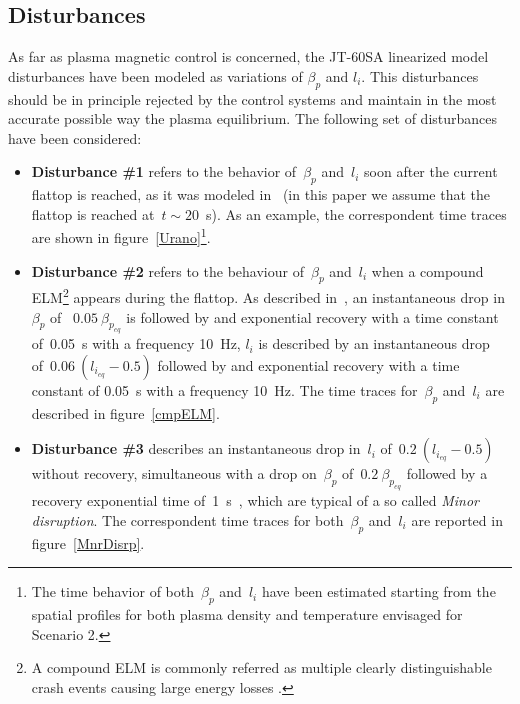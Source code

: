 \subsection{Disturbances}


As far as plasma magnetic control is concerned, the JT-60SA linearized model disturbances have been modeled as variations of $\beta_p$ and $l_i$. This disturbances should be in principle rejected by the control systems and maintain in the most accurate possible way the plasma equilibrium.  The following set of disturbances have been considered: 

\begin{itemize}
	\item \textbf{Disturbance \#1} refers to the behavior of~$\beta_p$ and~$l_i$ soon after the current flattop is reached, as it was modeled in~\cite{urano2015development} (in this paper we assume that the flattop is reached at~$t\sim 20$~s). As an example, the correspondent time traces are shown in figure~\ref{Urano}\footnote{The time behavior of both~$\beta_p$ and~$l_i$ have been estimated starting from the spatial profiles for both plasma density and temperature envisaged for Scenario 2.}.
	
	


	
	\item \textbf{Disturbance \#2} refers to the behaviour of~$\beta_p$ and~$l_i$ when a compound ELM\footnote{A compound ELM is commonly referred as multiple clearly distinguishable
	crash events causing large energy losses \cite{Meyer2017}.} appears during the flattop.  As described in~\cite[p.~34]{JT60SA:PID}, an instantaneous drop   in~$\beta_p$ of ~$0.05~\beta_{p_{eq}}$ is followed by and exponential recovery with a time constant of~0.05~s with a frequency 10~Hz, $l_i$ is described by an instantaneous drop of~$0.06~(l_{i_{eq}}-0.5)$ followed by and exponential recovery with a time constant of 0.05~s with a frequency 10~Hz. The time traces for~$\beta_p$ and~$l_i$ are described in figure~\ref{cmpELM}.
	


	
	\item \textbf{Disturbance \#3} describes an instantaneous drop in~$l_i$ of~$0.2~(l_{i_{eq}}-0.5)$ without recovery, simultaneous with a drop on~$\beta_p$ of~$0.2~\beta_{p_{eq}}$ followed by a recovery exponential time of~1~s~\cite[p.~34]{JT60SA:PID}, which are typical of a so called \emph{Minor disruption}. The correspondent time traces for both~$\beta_p$ and~$l_i$ are reported in figure~\ref{MnrDisrp}.
\end{itemize}


